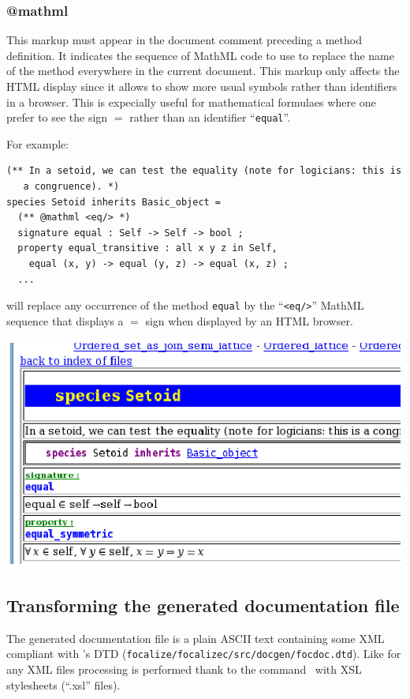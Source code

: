 \subsubsection{@mathml}
This markup must appear in the document comment preceding a method
definition. It indicates the sequence of MathML code to use to replace
the name of the method everywhere in the current document. This markup
only affects the HTML display since it allows to show more usual
symbols rather than identifiers in a browser. This is expecially
useful for mathematical formulaes where one prefer to see the sign $=$
rather than an identifier ``{\tt equal}''.

For example:
{\scriptsize
\begin{lstlisting}
(** In a setoid, we can test the equality (note for logicians: this is
   a congruence). *)
species Setoid inherits Basic_object =
  (** @mathml <eq/> *)
  signature equal : Self -> Self -> bool ;
  property equal_transitive : all x y z in Self,
    equal (x, y) -> equal (y, z) -> equal (x, z) ;
  ...
\end{lstlisting}
}
will replace any occurrence of the method {\tt equal} by the
``\verb+<eq/>+'' MathML sequence that displays a $=$ sign when
displayed by an HTML browser.

\medskip
\includegraphics{mathml_snapshot.ps}



\subsection{Transforming the generated documentation file}
The generated documentation file is a plain ASCII text containing some
XML compliant with \focal's DTD
({\tt focalize/focalizec/src/docgen/focdoc.dtd}). Like for any XML
files processing is performed thank to the command \xsltproc\ with 
XSL stylesheets (``.xsl'' files).

